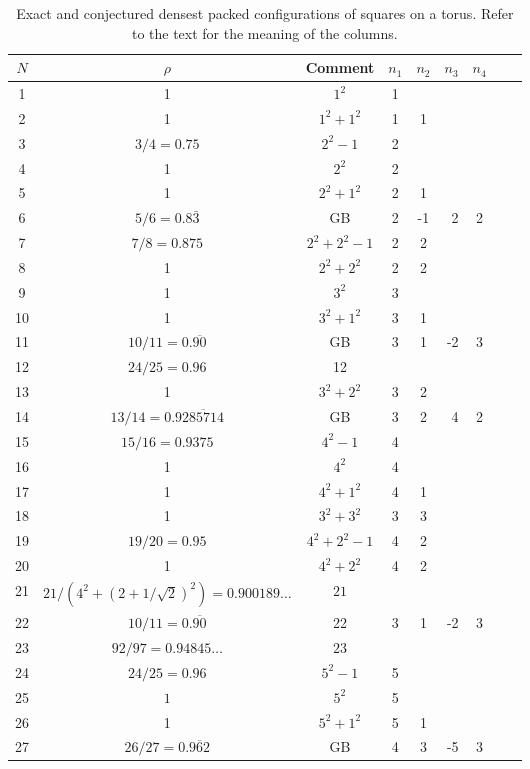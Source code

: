 \vspace{.3in}
\begin{table}
\label{table}
\caption{Exact and conjectured densest packed configurations of squares on a torus.  Refer to the text for the meaning of the columns.}
  \begin{tabular}{|c | c|c | c| c | r | c | c | c |}
\hline
  $N$ &$\rho$&Comment& $n_1$ & $n_2$ & $n_3$ & $n_4$  \\ \hline \hline
   1 &1&  $1^2$ & 1&  &   &    \\ \hline 
   2 &1&  $1^2+1^2$ &1& 1 &  &  \\ \hline
   3 &$3/4=0.75$&  $2^2 -1$ &2&  & &   \\ \hline
   4 &1&  $2^2$ &2& & &   \\ \hline
   5 &1&  $2^2+1^2$ &2& 1 &    & \\ \hline
   6 &$5/6=0.8\bar{3}$& GB &2& -1 &2 & 2   \\ \hline
   7 &$7/8=0.875$& $2^2+2^2 -1$ &2& 2 & &     \\ \hline
   8 &1& $2^2+2^2 $ &2& 2 & &     \\ \hline
   9 &1&  $3^2$ &3& & &  \\ \hline
   10 &1&  $3^2+1^2$ &3& 1 &    & \\ \hline
   11 &$10/11=0.\overline{90}$& GB &3& 1 &-2 & 3   \\ \hline
   12 &$24/25=0.96$& 12 && & &    \\ \hline
   13 &1&  $3^2+2^2$ &3& 2 &    & \\ \hline
   14 &$13/14=0.9\overline{285714}$& GB &3& 2 &4 & 2   \\ \hline
   15 &$15/16=0.9375$&  $4^2 -1$ &4&  & &   \\ \hline
   16 &1&  $4^2$ &4& & &   \\ \hline
   17 &1&  $4^2+1^2$ &4& 1 &    & \\ \hline
   18 &1&  $3^2+3^2$ &3& 3 &    & \\ \hline
   19 &$19/20=0.95$&  $4^2 +2^2 -1$ &4& 2 & &   \\ \hline
   20 &1&  $4^2+2^2$ &4& 2 &    & \\ \hline
   21 &$21/(4^2+(2+1/\sqrt{2})^2)=0.900189 \ldots$&  $21$ & &  &   &    \\ \hline 
   22 &$10/11=0.\overline{90}$& 22 &3& 1 &-2 & 3  \\ \hline
   23 &$92/97=0.94845 \ldots$&  $23$ & &  &   &    \\ \hline
   24 &$24/25=0.96$&  $5^2 -1$ &5&  & &   \\ \hline
   25 &$1$&  $5^2$ &5&  & &   \\ \hline
   26 &1&  $5^2+1^2$ &5& 1 &    & \\ \hline
   27 &$26/27=0.\overline{962}$& GB &4&3 &-5 & 3  \\ \hline

\hline
\end{tabular}
\end{table}




